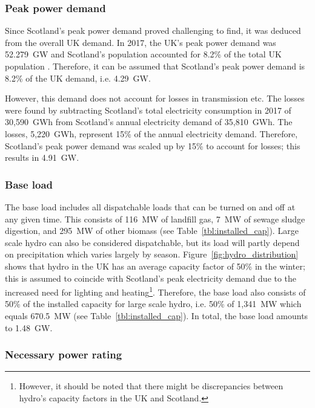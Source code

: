 \subsubsection{Peak power demand}

Since Scotland's peak power demand proved challenging to find, it was deduced from the overall UK demand.
In 2017, the UK's peak power demand was 52.279~GW \citep{BEIS2018PeakDemand} and Scotland's population accounted for 8.2\% of the total UK population \citep{OfficeforNationalStatistics2018}.
Therefore, it can be assumed that Scotland's peak power demand is 8.2\% of the UK demand, i.e. 4.29~GW.

However, this demand does not account for losses in transmission etc.
The losses were found by subtracting Scotland's total electricity consumption in 2017 of 30,590~GWh \citep{BEIS2018ElecUK} from Scotland's annual electricity demand of 35,810~GWh.
The losses, 5,220~GWh, represent 15\% of the annual electricity demand.
Therefore, Scotland's peak power demand was scaled up by 15\% to account for losses; this results in 4.91~GW.



\subsubsection{Base load} \label{sec:base_load}

The base load includes all dispatchable loads that can be turned on and off at any given time.
This consists of 116~MW of landfill gas, 7~MW of sewage sludge digestion, and 295~MW of other biomass (see Table~\ref{tbl:installed_cap}).
Large scale hydro can also be considered dispatchable, but its load will partly depend on precipitation which varies largely by season.
Figure~\ref{fig:hydro_distribution} shows that hydro in the UK has an average capacity factor of 50\% in the winter; this is assumed to coincide with Scotland's peak electricity demand due to the increased need for lighting and heating\footnote{However, it should be noted that there might be discrepancies between hydro's capacity factors in the UK and Scotland.}.
Therefore, the base load also consists of 50\% of the installed capacity for large scale hydro, i.e. 50\% of 1,341~MW which equals 670.5~MW (see Table~\ref{tbl:installed_cap}).
In total, the base load amounts to 1.48~GW.




\subsubsection{Necessary power rating}

